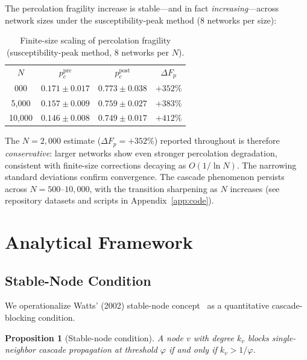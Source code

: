 \documentclass[aps,pre,twocolumn,superscriptaddress,showpacs]{revtex4-2}
\newcommand{\pc}{p_c}
\newcommand{\DF}{\Delta F}
\begin{document}
The percolation fragility increase is stable---and in fact \emph{increasing}---across network sizes under the susceptibility-peak method ($8$ networks per size):

\begin{table}[h]
\caption{Finite-size scaling of percolation fragility (susceptibility-peak method, 8 networks per $N$).}
\label{tab:fss}
\begin{ruledtabular}
\begin{tabular}{cccc}
$N$ & $\pc^{\mathrm{pre}}$ & $\pc^{\mathrm{post}}$ & $\DF_p$ \\
\colrule
2{,}000 & $0.171 \pm 0.017$ & $0.773 \pm 0.038$ & $+352\%$ \\
5{,}000 & $0.157 \pm 0.009$ & $0.759 \pm 0.027$ & $+383\%$ \\
10{,}000 & $0.146 \pm 0.008$ & $0.749 \pm 0.017$ & $+412\%$ \\
\end{tabular}
\end{ruledtabular}
\end{table}

The $N=2{,}000$ estimate ($\DF_p = +352\%$) reported throughout is therefore \emph{conservative}: larger networks show even stronger percolation degradation, consistent with finite-size corrections decaying as $O(1/\ln N)$. The narrowing standard deviations confirm convergence. The cascade phenomenon persists across $N=500$--$10{,}000$, with the transition sharpening as $N$ increases (see repository datasets and scripts in Appendix~\ref{app:code}).

\section{Analytical Framework}
\label{sec:analytical}

\subsection{Stable-Node Condition}

We operationalize Watts' (2002) stable-node concept~\cite{Watts2002} as a quantitative cascade-blocking condition.

\textbf{Proposition 1} (Stable-node condition). \emph{A node $v$ with degree $k_v$ blocks single-neighbor cascade propagation at threshold $\varphi$ if and only if $k_v > 1/\varphi$.}
\end{document}
